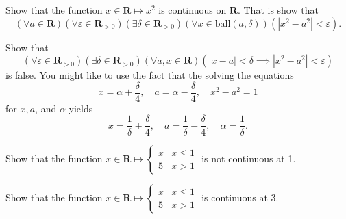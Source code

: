 \documentclass[12pt,fleqn]{exam}
\newcommand{\reals}{\mathbf{R}}
\newcommand{\ball}{\mathrm{ball}}
\begin{document}
\begin{questions} 

\question[5] Show that the function $x \in \reals \mapsto x^2$ is continuous 
on $\reals$. That is show that
\begin{equation*}
    \left(\forall a \in \reals \right) 
    \left(\forall \varepsilon \in \reals_{>0} \right)
    \left(\exists \delta \in \reals_{>0} \right)
    \left(\forall x \in \ball(a,\delta) \right)
    \left(|x^2 - a^2| < \varepsilon \right).
\end{equation*}
\begin{solution}
    
\end{solution}


\question[5] Show that
\begin{equation*}
     \left(\forall \varepsilon \in \reals_{>0} \right)
    \left(\exists \delta \in \reals_{>0} \right)
    \left(\forall a, x \in \reals \right)
    \left(|x - a| < \delta \implies |x^2 - a^2| < \varepsilon \right)
\end{equation*}
is false.  You might like to use the fact that the solving the equations
\begin{equation*}
     x = \alpha + \frac{\delta}{4}, \quad a = \alpha - \frac{\delta}{4},
     \quad x^2 - a^2 = 1
\end{equation*}
for $x,a$, and $\alpha$ yields
\begin{equation*}
    x = \frac{1}{\delta} + \frac{\delta}{4}, \quad 
    a =  \frac{1}{\delta} - \frac{\delta}{4}, \quad
    \alpha =  \frac{1}{\delta}.
\end{equation*}
\begin{solution}
    
\end{solution}
\question[5] Show that the function $x \in \reals \mapsto 
\begin{cases} x & x \leq 1 \\ 5 & x > 1 \end{cases}$ is not continuous at 1.
\begin{solution}
    
\end{solution}
\question[5] Show that the function $x \in \reals \mapsto 
\begin{cases} x & x \leq 1 \\ 5 & x > 1 \end{cases}$ is continuous at 3.
\end{questions}
\begin{solution}
    
\end{solution}
\end{document}
